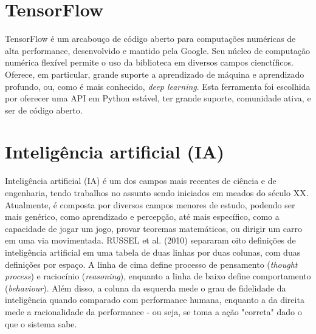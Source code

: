 \section{TensorFlow}
\label{sec:tensorflow}

TensorFlow é um arcabouço de código aberto para computações numéricas de alta performance, desenvolvido e mantido pela Google. Seu núcleo de computação numérica flexível permite o uso da biblioteca em diversos campos cienctíficos. Oferece, em particular, grande suporte a aprendizado de máquina e aprendizado profundo, ou, como é mais conhecido, \textit{deep learning}.
Esta ferramenta foi escolhida por oferecer uma API em Python estável, ter grande suporte, comunidade ativa, e ser de código aberto.

% 
\section{Inteligência artificial (IA)}
\label{sec:ia}

Inteligência artificial (IA) é um dos campos mais recentes de ciência e de engenharia, tendo trabalhos no assunto sendo iniciados em meados do século XX. Atualmente, é composta por diversos campos menores de estudo, podendo ser mais genérico, como aprendizado e percepção, até mais específico, como a capacidade de jogar um jogo, provar teoremas matemáticos, ou dirigir um carro em uma via movimentada.
RUSSEL et al. (2010) separaram oito definições de inteligência artificial em uma tabela de duas linhas por duas colunas, com duas definições por espaço. A linha de cima define processo de pensamento (\textit{thought process}) e raciocínio (\textit{reasoning}), enquanto a linha de baixo define comportamento (\textit{behaviour}). Além disso, a coluna da esquerda mede o grau de fidelidade da inteligência quando comparado com performance humana, enquanto a da direita mede a racionalidade da performance - ou seja, se toma a ação "correta"{} dado o que o sistema sabe.

